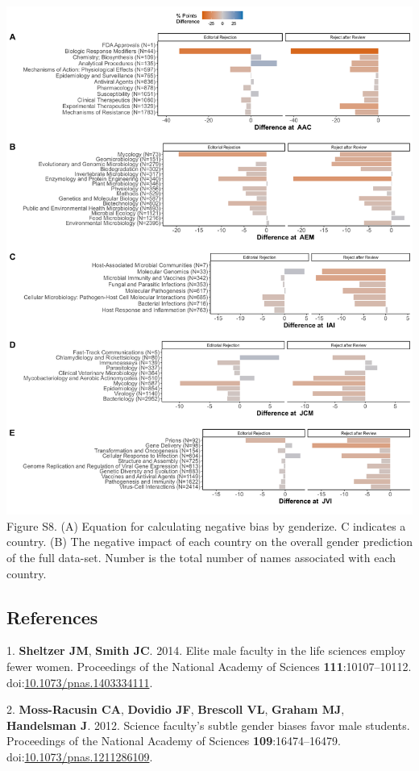\documentclass[11pt,]{article}
\begin{document}
\includegraphics{Figure_S8.png} Figure S8. (A) Equation for calculating
negative bias by genderize. C indicates a country. (B) The negative
impact of each country on the overall gender prediction of the full
data-set. Number is the total number of names associated with each
country.

\newpage

\subsection*{References}\label{references}

\hypertarget{refs}{}
\hypertarget{ref-sheltzer_elite_2014}{}
1. \textbf{Sheltzer JM}, \textbf{Smith JC}. 2014. Elite male faculty in
the life sciences employ fewer women. Proceedings of the National
Academy of Sciences \textbf{111}:10107--10112.
doi:\href{https://doi.org/10.1073/pnas.1403334111}{10.1073/pnas.1403334111}.

\hypertarget{ref-moss-racusin_science_2012}{}
2. \textbf{Moss-Racusin CA}, \textbf{Dovidio JF}, \textbf{Brescoll VL},
\textbf{Graham MJ}, \textbf{Handelsman J}. 2012. Science faculty's
subtle gender biases favor male students. Proceedings of the National
Academy of Sciences \textbf{109}:16474--16479.
doi:\href{https://doi.org/10.1073/pnas.1211286109}{10.1073/pnas.1211286109}.
\end{document}
